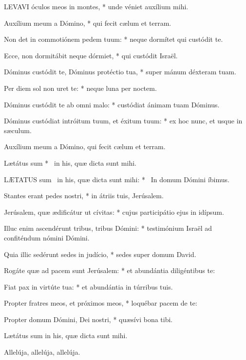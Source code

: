 \lettrine[lines=2]{L}{EVAVI} óculos meos in montes, * unde véniet auxílium mihi.

Auxílium meum a Dómino, * qui fecit cælum et terram.

Non det in commotiónem pedem tuum: * neque dormítet qui custódit te.

Ecce, non dormitábit neque dórmiet, * qui custódit Israël.

Dóminus custódit te, Dóminus protéctio tua, * super mánum déxteram tuam.

Per diem sol non uret te: * neque luna per noctem.

Dóminus custódit te ab omni malo: * custódiat ánimam tuam Dóminus.

Dóminus custódiat intróitum tuum, et éxitum tuum: * ex hoc nunc, et usque in sæculum.

 Auxílium meum a Dómino, qui fecit cælum et terram.

 Lætátus sum * \textdagger\ in his, quæ dicta sunt mihi. \textdaggerdbl


\lettrine[lines=2]{L}{ÆTATUS} sum \textdagger\ in his, quæ dicta sunt mihi: * \textdaggerdbl\ In domum Dómini íbimus.

Stantes erant pedes nostri, * in átriis tuis, Jerúsalem.

Jerúsalem, quæ ædificátur ut cívitas: * cujus participátio ejus in idípsum.

Illuc enim ascendérunt tribus, tribus Dómini: * testimónium Israël ad confiténdum nómini Dómini.

Quia illic sedérunt sedes in judício, * sedes super domum David.

Rogáte quæ ad pacem sunt Jerúsalem: * et abundántia diligéntibus te:

Fiat pax in virtúte tua: * et abundántia in túrribus tuis.

Propter fratres meos, et próximos meos, * loquébar pacem de te:

Propter domum Dómini, Dei nostri, * quæsívi bona tibi.


 Lætátus sum in his, quæ dicta sunt mihi.


 Allelúja, allelúja, allelúja.


